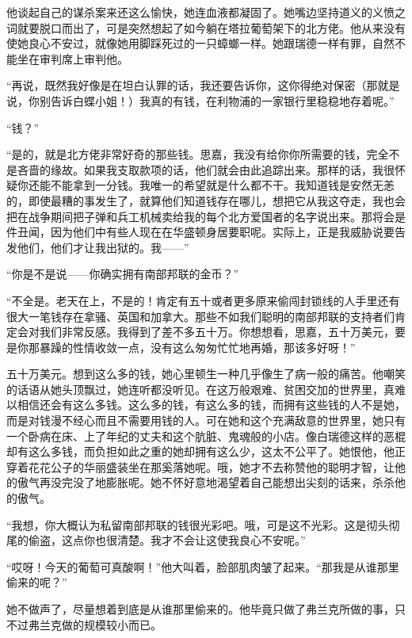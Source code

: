 \par 他谈起自己的谋杀案来还这么愉快，她连血液都凝固了。她嘴边坚持道义的义愤之词就要脱口而出了，可是突然想起了如今躺在塔拉葡萄架下的北方佬。他从来没有使她良心不安过，就像她用脚踩死过的一只蟑螂一样。她跟瑞德一样有罪，自然不能坐在审判席上审判他。
\par “再说，既然我好像是在坦白认罪的话，我还要告诉你，这你得绝对保密（那就是说，你别告诉白蝶小姐！）我真的有钱，在利物浦的一家银行里稳稳地存着呢。”
\par “钱？”
\par “是的，就是北方佬非常好奇的那些钱。思嘉，我没有给你你所需要的钱，完全不是吝啬的缘故。如果我支取款项的话，他们就会由此追踪出来。那样的话，我很怀疑你还能不能拿到一分钱。我唯一的希望就是什么都不干。我知道钱是安然无恙的，即使最糟的事发生了，就算他们知道钱存在哪儿，想把它从我这夺走，我也会把在战争期间把子弹和兵工机械卖给我的每个北方爱国者的名字说出来。那将会是件丑闻，因为他们中有些人现在在华盛顿身居要职呢。实际上，正是我威胁说要告发他们，他们才让我出狱的。我——”
\par “你是不是说——你确实拥有南部邦联的金币？”
\par “不全是。老天在上，不是的！肯定有五十或者更多原来偷闯封锁线的人手里还有很大一笔钱存在拿骚、英国和加拿大。那些不如我们聪明的南部邦联的支持者们肯定会对我们非常反感。我得到了差不多五十万。你想想看，思嘉，五十万美元，要是你那暴躁的性情收敛一点，没有这么匆匆忙忙地再婚，那该多好呀！”
\par 五十万美元。想到这么多的钱，她心里顿生一种几乎像生了病一般的痛苦。他嘲笑的话语从她头顶飘过，她连听都没听见。在这万般艰难、贫困交加的世界里，真难以相信还会有这么多钱。这么多的钱，有这么多的钱，而拥有这些钱的人不是她，而是对钱漫不经心而且不需要用钱的人。可在她和这个充满敌意的世界里，她只有一个卧病在床、上了年纪的丈夫和这个肮脏、鬼魂般的小店。像白瑞德这样的恶棍却有这么多钱，而负担如此之重的她却拥有这么少，这太不公平了。她恨他，他正穿着花花公子的华丽盛装坐在那奚落她呢。哦，她才不去称赞他的聪明才智，让他的傲气再没完没了地膨胀呢。她不怀好意地渴望着自己能想出尖刻的话来，杀杀他的傲气。
\par “我想，你大概认为私留南部邦联的钱很光彩吧。哦，可是这不光彩。这是彻头彻尾的偷盗，这点你也很清楚。我才不会让这使我良心不安呢。”
\par “哎呀！今天的葡萄可真酸啊！”他大叫着，脸部肌肉皱了起来。“那我是从谁那里偷来的呢？”
\par 她不做声了，尽量想着到底是从谁那里偷来的。他毕竟只做了弗兰克所做的事，只不过弗兰克做的规模较小而已。
